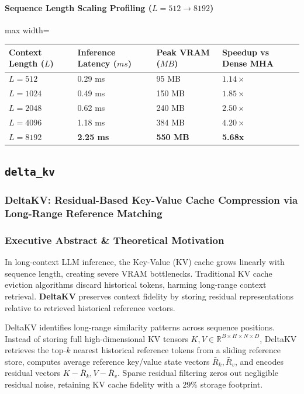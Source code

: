 \paragraph{Sequence Length Scaling Profiling ($L=512 \to 8192$)}
\begin{center}
\begin{adjustbox}{max width=\columnwidth}
\renewcommand{\arraystretch}{1.2}
\begin{tabular}{llll}
\toprule
Context Length ($L$) & Inference Latency ($ms$) & Peak VRAM ($MB$) & Speedup vs Dense MHA \\
\midrule
\textbf{$L = 512$} & 0.29 ms & 95 MB & $1.14\times$ \\
\textbf{$L = 1024$} & 0.49 ms & 150 MB & $1.85\times$ \\
\textbf{$L = 2048$} & 0.62 ms & 240 MB & $2.50\times$ \\
\textbf{$L = 4096$} & 1.18 ms & 384 MB & $4.20\times$ \\
\textbf{$L = 8192$} & \textbf{2.25 ms} & \textbf{550 MB} & \textbf{5.68x} \\


\bottomrule
\end{tabular}
\end{adjustbox}
\end{center}

\subsection{\texttt{delta\_kv}}
\subsubsection*{DeltaKV: Residual-Based Key-Value Cache Compression via Long-Range Reference Matching}

\subsubsection*{Executive Abstract \& Theoretical Motivation}

In long-context LLM inference, the Key-Value (KV) cache grows linearly with sequence length, creating severe VRAM bottlenecks. Traditional KV cache eviction algorithms discard historical tokens, harming long-range context retrieval. \textbf{DeltaKV} preserves context fidelity by storing residual representations relative to retrieved historical reference vectors.

DeltaKV identifies long-range similarity patterns across sequence positions. Instead of storing full high-dimensional KV tensors $K, V \in \mathbb{R}^{B \times H \times N \times D}$, DeltaKV retrieves the top-$k$ nearest historical reference tokens from a sliding reference store, computes average reference key/value state vectors $\bar{R}_k, \bar{R}_v$, and encodes residual vectors $K - \bar{R}_k, V - \bar{R}_v$. Sparse residual filtering zeros out negligible residual noise, retaining KV cache fidelity with a $29\%$ storage footprint.

